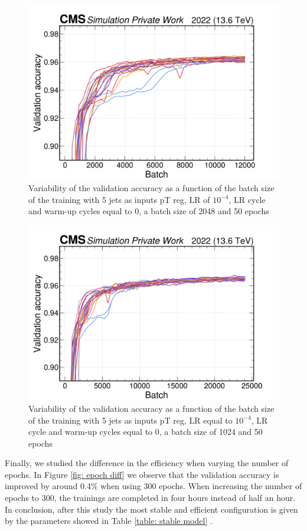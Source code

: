 \begin{figure}[hbt]
    \centering
    \includegraphics[width=0.7\linewidth]{Images/6.Improving/Variability Study/var 2048.png}
    \caption{Variability of the validation accuracy as a function of the batch size of the training with 5 jets as inputs pT reg, LR of $10^{-4}$, LR cycle and warm-up cycles equal to 0, a batch size of 2048 and 50 epochs}
    \label{fig: stable test}
\end{figure}

\begin{figure}[hbt]
    \centering
    \includegraphics[width=0.7\linewidth]{Images/6.Improving/Variability Study/var 1024.png}
    \caption{Variability of the validation accuracy as a function of the batch size of the training with 5 jets as inputs pT reg, LR equal to $10^{-4}$, LR cycle and warm-up cycles equal to 0, a batch size of 1024 and 50 epochs}
    \label{fig: stable test 1024}
\end{figure}



Finally, we studied the difference in the efficiency when varying the number of epochs. In Figure \ref{fig: epoch diff} we observe that the validation accuracy is improved by around 0.4\% when using 300 epochs. When increasing the number of epochs to 300, the trainings are completed in four hours instead of half an hour. In conclusion, after this study the most stable and efficient configuration is given by the parameters showed in Table \ref{table: stable model} .

